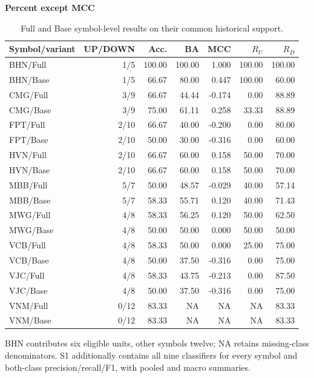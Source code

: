 \begin{table}[!htb]
\centering\small
\setlength{\tabcolsep}{3pt}
\renewcommand{\arraystretch}{1.15}
\caption{Full and Base symbol-level results on their common historical support.}
\label{tab:symbol_results}
\textbf{Percent except MCC}\par\smallskip
\begin{tabular}{lrrrrrr}
\hline
Symbol/variant & UP/DOWN & Acc. & BA & MCC & $R_U$ & $R_D$ \\
\hline
BHN/Full & 1/5 & 100.00 & 100.00 & 1.000 & 100.00 & 100.00 \\
BHN/Base & 1/5 & 66.67 & 80.00 & 0.447 & 100.00 & 60.00 \\
CMG/Full & 3/9 & 66.67 & 44.44 & -0.174 & 0.00 & 88.89 \\
CMG/Base & 3/9 & 75.00 & 61.11 & 0.258 & 33.33 & 88.89 \\
FPT/Full & 2/10 & 66.67 & 40.00 & -0.200 & 0.00 & 80.00 \\
FPT/Base & 2/10 & 50.00 & 30.00 & -0.316 & 0.00 & 60.00 \\
HVN/Full & 2/10 & 66.67 & 60.00 & 0.158 & 50.00 & 70.00 \\
HVN/Base & 2/10 & 66.67 & 60.00 & 0.158 & 50.00 & 70.00 \\
MBB/Full & 5/7 & 50.00 & 48.57 & -0.029 & 40.00 & 57.14 \\
MBB/Base & 5/7 & 58.33 & 55.71 & 0.120 & 40.00 & 71.43 \\
MWG/Full & 4/8 & 58.33 & 56.25 & 0.120 & 50.00 & 62.50 \\
MWG/Base & 4/8 & 50.00 & 50.00 & 0.000 & 50.00 & 50.00 \\
VCB/Full & 4/8 & 58.33 & 50.00 & 0.000 & 25.00 & 75.00 \\
VCB/Base & 4/8 & 50.00 & 37.50 & -0.316 & 0.00 & 75.00 \\
VJC/Full & 4/8 & 58.33 & 43.75 & -0.213 & 0.00 & 87.50 \\
VJC/Base & 4/8 & 50.00 & 37.50 & -0.316 & 0.00 & 75.00 \\
VNM/Full & 0/12 & 83.33 & NA & NA & NA & 83.33 \\
VNM/Base & 0/12 & 83.33 & NA & NA & NA & 83.33 \\
\hline
\end{tabular}\par\medskip
\begin{minipage}{\textwidth}\footnotesize BHN contributes six eligible units, other symbols twelve; NA retains missing-class denominators. S1 additionally contains all nine classifiers for every symbol and both-class precision/recall/F1, with pooled and macro summaries.\end{minipage}
\end{table}
